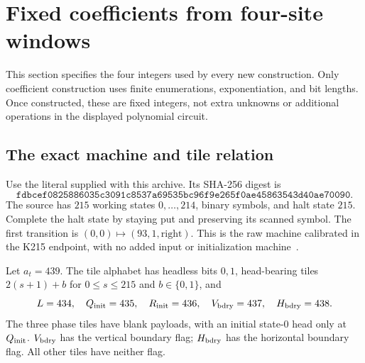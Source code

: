 \documentclass[11pt,a4paper]{article}
\theoremstyle{remark}\newtheorem{remark}[theorem]{Remark}
\newcommand{\src}[1]{\texttt{\detokenize{#1}}}
\begin{document}
\section{Fixed coefficients from four-site windows}
\label{sec:coefficients}

This section specifies the four integers used by every new construction.
Only coefficient construction uses finite enumerations, exponentiation,
and bit lengths. Once constructed, these are fixed integers, not extra
unknowns or additional operations in the displayed polynomial circuit.

\subsection{The exact machine and tile relation}

Use the literal \src{compiler/k215.tm} supplied with this archive. Its
SHA-256 digest is
\[
\texttt{fdbcef0825886035c3091c8537a69535bc96f9e265f0ae45863543d40ae70090}.
\]
The source has $215$ working states $0,\ldots,214$, binary symbols,
and halt state $215$. Complete the halt state by staying put and
preserving its scanned symbol. The first transition is
$(0,0)\mapsto(93,1,\mathrm{right})$.
This is the raw machine calibrated in the K215 endpoint, with no added
input or initialization machine~\cite{endpoint,blank}.

Let $a_t=439$. The tile alphabet has headless bits $0,1$, head-bearing
tiles $2(s+1)+b$ for $0\le s\le215$ and $b\in\{0,1\}$, and
\[
 L=434,\quad Q_{\rm init}=435,\quad R_{\rm init}=436,\quad
 V_{\rm bdry}=437,\quad H_{\rm bdry}=438.
\]
The three phase tiles have blank payloads, with an initial state-$0$
head only at $Q_{\rm init}$. $V_{\rm bdry}$ has the vertical boundary
flag; $H_{\rm bdry}$ has the horizontal boundary flag. All other
tiles have neither flag.
\end{document}
